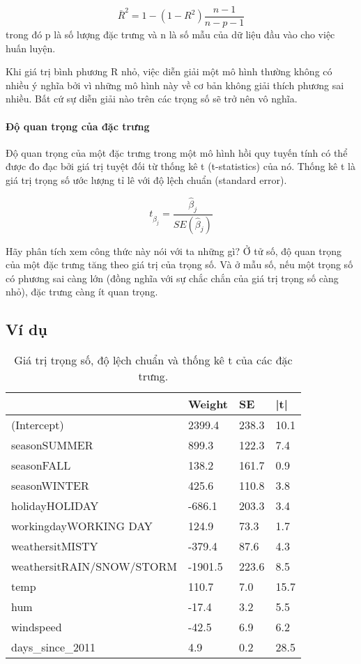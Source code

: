 $$\bar{R}^2=1-(1-R^2)\frac{n-1}{n-p-1}$$
trong đó p là số lượng đặc trưng và n là số mẫu của dữ liệu đầu vào cho việc huấn luyện.

Khi giá trị bình phương R nhỏ, việc diễn giải một mô hình thường không có nhiều ý nghĩa bởi vì những mô hình này về cơ bản không giải thích phương sai nhiều. Bất cứ sự diễn giải nào trên các trọng số sẽ trở nên vô nghĩa.

\paragraph{Độ quan trọng của đặc trưng}
Độ quan trọng của một đặc trưng trong một mô hình hồi quy tuyến tính có thể được đo đạc bởi giá trị tuyệt đối từ thống kê t (t-statistics) của nó. Thống kê t là giá trị trọng số ước lượng tỉ lê với độ lệch chuẩn (standard error).

$$t_{\hat{\beta}_j}=\frac{\hat{\beta}_j}{SE(\hat{\beta}_j)}$$

Hãy phân tích xem công thức này nói với ta những gì? Ở tử số, độ quan trọng của một đặc trưng tăng theo giá trị của trọng số. Và ở mẫu số, nếu một trọng số có phương sai càng lớn (đồng nghĩa với sự chắc chắn của giá trị trọng số càng nhỏ), đặc trưng càng ít quan trọng. 

\subsection{Ví dụ}
\begin{table*}[hbt!]
\centering
\begin{tabular}{|l|l|l|l|}
\hline
                          & Weight  & SE    & |t|  \\ \hline
(Intercept)               & 2399.4  & 238.3 & 10.1 \\ \hline
seasonSUMMER              & 899.3   & 122.3 & 7.4  \\ \hline
seasonFALL                & 138.2   & 161.7 & 0.9  \\ \hline
seasonWINTER              & 425.6   & 110.8 & 3.8  \\ \hline
holidayHOLIDAY            & -686.1  & 203.3 & 3.4  \\ \hline
workingdayWORKING DAY     & 124.9   & 73.3  & 1.7  \\ \hline
weathersitMISTY           & -379.4  & 87.6  & 4.3  \\ \hline
weathersitRAIN/SNOW/STORM & -1901.5 & 223.6 & 8.5  \\ \hline
temp                      & 110.7   & 7.0   & 15.7 \\ \hline
hum                       & -17.4   & 3.2   & 5.5  \\ \hline
windspeed                 & -42.5   & 6.9   & 6.2  \\ \hline
days\_since\_2011         & 4.9     & 0.2   & 28.5 \\ \hline
\end{tabular}
\caption{Giá trị trọng số, độ lệch chuẩn và thống kê t của các đặc trưng.}
\label{tab:4_2}
\end{table*}

